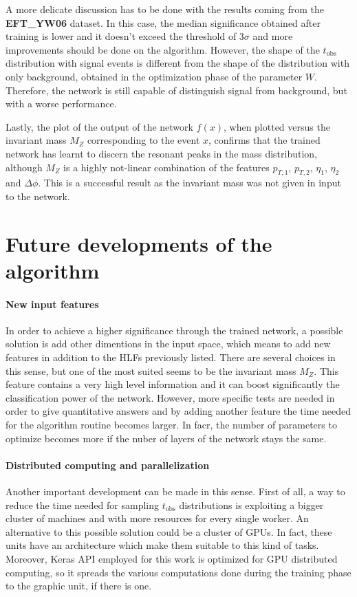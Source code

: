 A more delicate discussion has to be done with the results coming from the \textbf{EFT\_YW06} dataset. In this case, the median significance obtained after training is lower and it doesn't exceed the threshold of $3\sigma$ and more improvements should be done on the algorithm. However, the shape of the $t_\mathrm{obs}$ distribution with signal events is different from the shape of the distribution with only background, obtained in the optimization phase of the parameter $W$. Therefore, the network is still capable of distinguish signal from background, but with a worse performance.

Lastly, the plot of the output of the network $f(x)$, when plotted versus the invariant mass $M_{Z}$ corresponding to the event $x$, confirms that the trained network has learnt to discern the resonant peaks in the mass distribution, although $M_{Z}$ is a highly not-linear combination of the features $p_{T,1}$, $p_{T,2}$, $\eta_{1}$, $\eta_{2}$ and $\Delta \phi$. This is a successful result as the invariant mass was not given in input to the network.





\section{Future developments of the algorithm}
\label{sec:FUTURE_DEVELOPMENTS}

\paragraph*{New input features}
In order to achieve a higher significance through the trained network, a possible solution is add other dimentions in the input space, which means to add new features in addition to the HLFs previously listed. There are several choices in this sense, but one of the most suited seems to be the invariant mass $M_{Z}$. This feature contains a very high level information and it can boost significantly the classification power of the network. However, more specific tests are needed in order to give quantitative answers and by adding another feature the time needed for the algorithm routine becomes larger. In facr, the number of parameters to optimize becomes more if the nuber of layers of the network stays the same.

\paragraph*{Distributed computing and parallelization}
Another important development can be made in this sense. First of all, a way to reduce the time needed for sampling $t_\mathrm{obs}$ distributions is exploiting a bigger cluster of machines and with more resources for every single worker. An alternative to this possible solution could be a cluster of GPUs. In fact, these units have an architecture which make them suitable to this kind of tasks. Moreover, Keras API employed for this work is optimized for GPU distributed computing, so it spreads the various computations done during the training phase to the graphic unit, if there is one.

